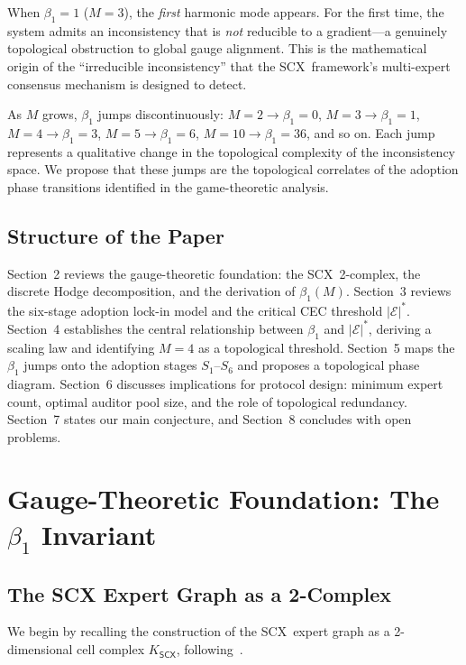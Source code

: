 \documentclass[12pt,a4paper]{article}
\theoremstyle{definition}
\theoremstyle{remark}
\theoremstyle{definition}
\newcommand{\CEC}{\mathcal{E}}
\newcommand{\SCX}{\textsf{SCX}}
\newcommand{\CECstar}{|\CEC|^*}
\begin{document}
When $\beta_1 = 1$ ($M=3$), the \emph{first} harmonic mode appears. For the first time, the system admits an inconsistency that is \emph{not} reducible to a gradient---a genuinely topological obstruction to global gauge alignment. This is the mathematical origin of the ``irreducible inconsistency'' that the \SCX\ framework's multi-expert consensus mechanism is designed to detect.

As $M$ grows, $\beta_1$ jumps discontinuously: $M=2 \to \beta_1=0$, $M=3 \to \beta_1=1$, $M=4 \to \beta_1=3$, $M=5 \to \beta_1=6$, $M=10 \to \beta_1=36$, and so on. Each jump represents a qualitative change in the topological complexity of the inconsistency space. We propose that these jumps are the topological correlates of the adoption phase transitions identified in the game-theoretic analysis.

\subsection{Structure of the Paper}

Section~2 reviews the gauge-theoretic foundation: the \SCX\ 2-complex, the discrete Hodge decomposition, and the derivation of $\beta_1(M)$. Section~3 reviews the six-stage adoption lock-in model and the critical CEC threshold $\CECstar$. Section~4 establishes the central relationship between $\beta_1$ and $\CECstar$, deriving a scaling law and identifying $M=4$ as a topological threshold. Section~5 maps the $\beta_1$ jumps onto the adoption stages $S_1$--$S_6$ and proposes a topological phase diagram. Section~6 discusses implications for protocol design: minimum expert count, optimal auditor pool size, and the role of topological redundancy. Section~7 states our main conjecture, and Section~8 concludes with open problems.

\section{Gauge-Theoretic Foundation: The \texorpdfstring{$\beta_1$}{β₁} Invariant}

\subsection{The SCX Expert Graph as a 2-Complex}

We begin by recalling the construction of the \SCX\ expert graph as a 2-dimensional cell complex $K_{\SCX}$, following~\cite{scx_gauge_formalized}.
\end{document}

